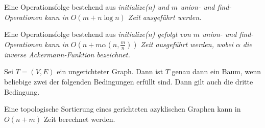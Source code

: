\documentclass{cheat-sheet}
\newcommand{\code}[1]{\em{#1}}
\begin{document}

\begin{satz}
  Eine Operationsfolge bestehend aus \code{initialize(n)} und $m$ \code{union}- und \code{find}-Operationen kann in $O(m + n \log n)$ Zeit ausgeführt werden.
\end{satz}

\begin{satz}
  Eine Operationsfolge bestehend aus \code{initialize(n)} gefolgt von $m$ \code{union}- und \code{find}-Operationen kann in $O(n + m \alpha(n, \tfrac{m}{n}))$ Zeit ausgeführt werden, wobei $\alpha$ die inverse Ackermann-Funktion bezeichnet.
\end{satz}




\begin{lem}
  Sei $T = (V, E)$ ein ungerichteter Graph. Dann ist $T$ genau dann ein Baum, wenn beliebige zwei der folgenden Bedingungen erfüllt sind. Dann gilt auch die dritte Bedingung.
  \begin{itemize}
  \end{itemize}
\end{lem}





\begin{satz}
  Eine topologische Sortierung eines gerichteten azyklischen Graphen kann in $O(n+m)$ Zeit berechnet werden.
\end{satz}

\end{document}
